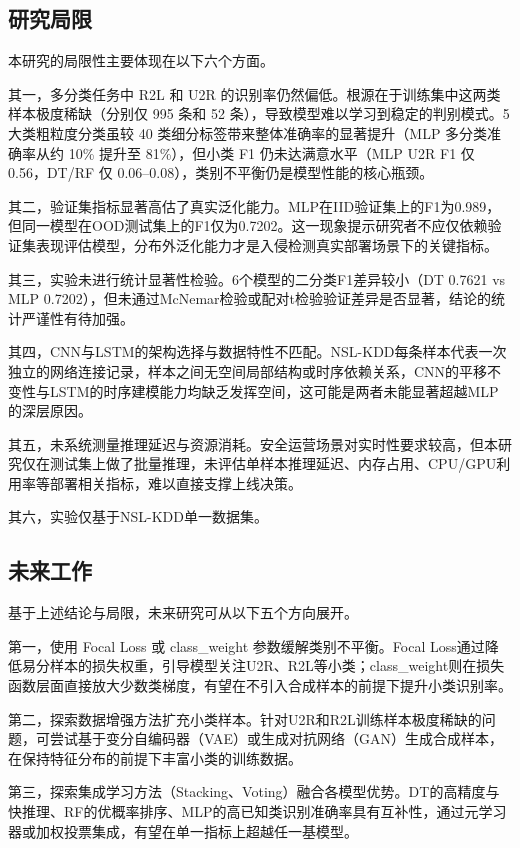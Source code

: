 \subsection{研究局限}

本研究的局限性主要体现在以下六个方面。

其一，多分类任务中 R2L 和 U2R 的识别率仍然偏低。根源在于训练集中这两类样本极度稀缺（分别仅 995 条和 52 条），导致模型难以学习到稳定的判别模式。5 大类粗粒度分类虽较 40 类细分标签带来整体准确率的显著提升（MLP 多分类准确率从约 10\% 提升至 81\%），但小类 F1 仍未达满意水平（MLP U2R F1 仅 0.56，DT/RF 仅 0.06–0.08），类别不平衡仍是模型性能的核心瓶颈。

其二，验证集指标显著高估了真实泛化能力。MLP在IID验证集上的F1为0.989，但同一模型在OOD测试集上的F1仅为0.7202。这一现象提示研究者不应仅依赖验证集表现评估模型，分布外泛化能力才是入侵检测真实部署场景下的关键指标。

其三，实验未进行统计显著性检验。6个模型的二分类F1差异较小（DT 0.7621 vs MLP 0.7202），但未通过McNemar检验或配对t检验验证差异是否显著，结论的统计严谨性有待加强。

其四，CNN与LSTM的架构选择与数据特性不匹配。NSL-KDD每条样本代表一次独立的网络连接记录，样本之间无空间局部结构或时序依赖关系，CNN的平移不变性与LSTM的时序建模能力均缺乏发挥空间，这可能是两者未能显著超越MLP的深层原因。

其五，未系统测量推理延迟与资源消耗。安全运营场景对实时性要求较高，但本研究仅在测试集上做了批量推理，未评估单样本推理延迟、内存占用、CPU/GPU利用率等部署相关指标，难以直接支撑上线决策。

其六，实验仅基于NSL-KDD单一数据集。

\subsection{未来工作}

基于上述结论与局限，未来研究可从以下五个方向展开。

第一，使用 Focal Loss 或 class\_weight 参数缓解类别不平衡。Focal Loss通过降低易分样本的损失权重，引导模型关注U2R、R2L等小类；class\_weight则在损失函数层面直接放大少数类梯度，有望在不引入合成样本的前提下提升小类识别率。

第二，探索数据增强方法扩充小类样本。针对U2R和R2L训练样本极度稀缺的问题，可尝试基于变分自编码器（VAE）或生成对抗网络（GAN）生成合成样本，在保持特征分布的前提下丰富小类的训练数据。

第三，探索集成学习方法（Stacking、Voting）融合各模型优势。DT的高精度与快推理、RF的优概率排序、MLP的高已知类识别准确率具有互补性，通过元学习器或加权投票集成，有望在单一指标上超越任一基模型。

